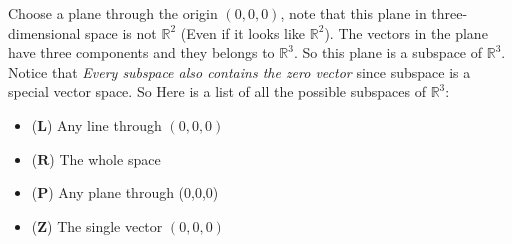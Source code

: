 \begin{example}
Choose a plane through the origin $(0,0,0)$, note that this plane in three-dimensional space is not $\mathbb{R}^{2}$ (Even if it looks like $\mathbb{R}^{2}$). The vectors in the plane have three components and they belongs to $\mathbb{R}^{3}$. So this plane is a subspace of $\mathbb{R}^{3}$.\\ Notice that \textit{Every subspace also contains the zero vector} since subspace is a special vector space. So Here is a list of all the possible subspaces of $\mathbb{R}^{3}$:\\
\begin{itemize}
\item
($\bm L$) Any line through $(0,0,0)$
\item
($\bm R$) The whole space
\item
($\bm P$) Any plane through (0,0,0)
\item
($\bm Z$) The single vector $(0,0,0)$
\end{itemize}
\end{example}
